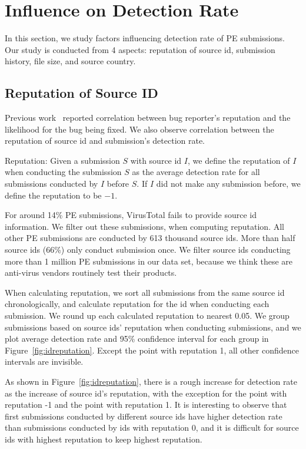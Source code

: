 \section{Influence on Detection Rate}
\label{sec:corr}
In this section, we study factors influencing detection rate of PE submissions. 
Our study is conducted from 4 aspects: reputation of source id, submission history, 
file size, and source country.

\subsection{Reputation of Source ID}


\label{sec:reputation}

Previous work~\cite{GuoICSE2010} reported correlation between bug reporter’s reputation and the likelihood for the bug being fixed. 
We also observe correlation between the reputation of source id and submission’s detection rate. 

\begin{definition}{Reputation:}
Given a submission $S$ with source id $I$, 
we define the reputation of $I$ when conducting the submission $S$ as the average detection rate for all submissions conducted by $I$ before $S$. 
If $I$ did not make any submission before, we define the reputation to be $-1$. 
\end{definition}

For around 14\% PE submissions, VirusTotal fails to provide source id information. 
We filter out these submissions, when computing reputation.
All other PE submissions are conducted by 613 thousand source ids. 
More than half source ids (66\%) only conduct submission once. 
We filter source ids conducting more than 1 million PE submissions in our data set, 
because we think these are anti-virus vendors routinely test their products. 

When calculating reputation, we sort all submissions from the same source id chronologically, 
and calculate reputation for the id when conducting each submission. 
We round up each calculated reputation to nearest 0.05. 
We group submissions based on source ids' reputation when conducting submissions, 
and we plot average detection rate and 95\% confidence interval for each group in Figure~\ref{fig:idreputation}. 
Except the point with reputation 1, all other confidence intervals are invisible.  

As shown in Figure~\ref{fig:idreputation}, 
there is a rough increase for detection rate as the increase of source id's reputation, 
with the exception for the point with reputation -1 and the point with reputation 1. 
It is interesting to observe that first submissions conducted by different source ids have higher 
detection rate than submissions conducted by ids with reputation 0, 
and it is difficult for source ids with highest reputation to keep highest reputation.  

